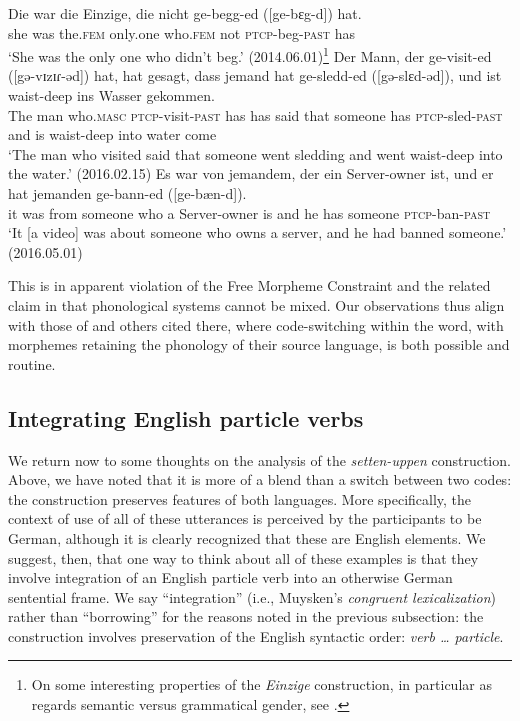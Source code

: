 \documentclass[output=paper]{langscibook}
\begin{document}
\ea\gll Die war die Einzige, die nicht {ge-begg-ed ({[}ge-bɛg-d{]})} hat.\\
she was the.\textsc{fem} only.one who.\textsc{fem} not \textsc{ptcp}-beg-\textsc{past} has\\
\glt `She was the only one who didn't beg.' (2014.06.01)\footnote{On some interesting properties of the \textit{Einzige} construction, in particular as regards semantic versus grammatical gender, see \citet{wurmbrand17a}.}
\ex\gll \label{gevisited}Der Mann, der {ge-visit-ed ({[}gə-vɪzɪɾ-əd{]})} hat, hat gesagt, dass jemand hat {ge-sledd-ed  ({[}gə-slɛd-əd{]})}, und ist waist-deep ins Wasser gekommen. \\
The man who.\textsc{masc} \textsc{ptcp}-visit-\textsc{past} has has said that someone has \textsc{ptcp}-sled-\textsc{past} and is waist-deep into water come\\
\glt `The man who visited said that someone went sledding and went waist-deep into the water.' (2016.02.15)
\ex\gll Es war von jemandem, der ein Server-owner ist, und er hat jemanden ge-bann-ed ({[}ge-b{\ae}n-d{]}).\\
it was from someone who a Server-owner is and he has someone \textsc{ptcp-}ban-\textsc{past}\\
\glt `It [a video] was about someone who owns a server, and he had banned someone.' (2016.05.01)
\z

This is in apparent violation of the Free Morpheme Constraint \citep{poplack80} and the related claim in \citet[45]{macswan99} that phonological systems cannot be mixed. Our observations thus align with those of \citet[159--160]{myersscotton02} and others cited there, where code-switching within the word, with morphemes retaining the phonology of their source language, is both possible and routine.

\subsection{Integrating English particle verbs}

We return now to some thoughts on the analysis of the \textit{setten-uppen} construction. Above, we have noted that it is more of a blend than a switch between two codes: the construction preserves features of both languages. More specifically, the context of use of all of these utterances is perceived by the participants to be German, although it is clearly recognized that these are English elements. We suggest, then, that one way to think about all of these examples is that they involve integration of an English particle verb into an otherwise German sentential frame. We say ``integration'' (i.e., Muysken's \textit{congruent lexicalization}) rather than ``borrowing'' for the reasons noted in the previous subsection: the construction involves preservation of the English syntactic order: \textit{verb {\ldots} particle}. 
\end{document}
